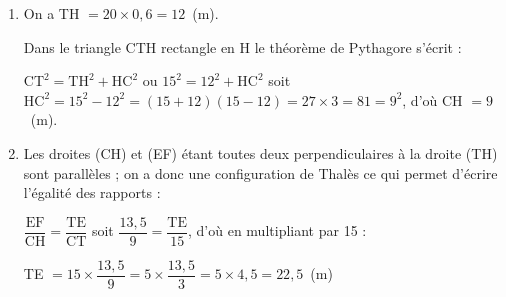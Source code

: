 
\medskip

%
%
%

\begin{enumerate}
\item %

On a TH $ = 20 \times 0,6 = 12$~(m).

Dans le triangle CTH rectangle en H le théorème de Pythagore s'écrit :

$\text{CT}^2  = \text{TH}^2 + \text{HC}^2$ ou $15^2 = 12^2 + \text{HC}^2$ soit $\text{HC}^2 = 15^2 - 12^2 = (15 + 12)(15 - 12) = 27 \times 3 = 81 = 9^2$, d'où CH $ = 9$~(m).
\item %

Les droites (CH) et (EF) étant toutes deux perpendiculaires à la droite (TH) sont parallèles ; on a donc une configuration de Thalès ce qui permet d'écrire l'égalité des rapports :

$\dfrac{\text{EF}}{\text{CH}} = \dfrac{\text{TE}}{\text{CT}}$ soit $\dfrac{13,5}{9} = \dfrac{\text{TE}}{\text{15}}$, d'où en multipliant par 15 :

TE $ = 15 \times \dfrac{13,5}{9} = 5 \times \dfrac{13,5}{3} = 5 \times 4,5 = 22,5$~(m)
\end{enumerate}

\vspace{0,5cm}

